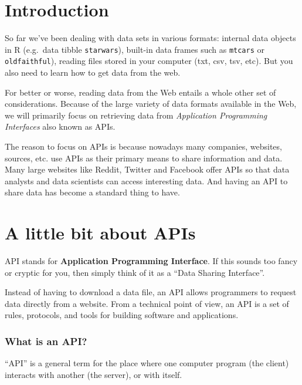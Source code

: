\documentclass[
]{book}
\begin{document}
\hypertarget{introduction-1}{%
\section{Introduction}\label{introduction-1}}

So far we've been dealing with data sets in various formats: internal data
objects in R (e.g.~data tibble \texttt{starwars}), built-in data frames such as
\texttt{mtcars} or \texttt{oldfaithful}), reading files stored in your computer (txt, csv,
tsv, etc). But you also need to learn how to get data from the web.

For better or worse, reading data from the Web entails a whole other set of
considerations. Because of the large variety of data formats available in the
Web, we will primarily focus on retrieving data from
\emph{Application Programming Interfaces} also known as APIs.

The reason to focus on APIs is because nowadays many companies, websites,
sources, etc. use APIs as their primary means to share information and data.
Many large websites like Reddit, Twitter and Facebook offer APIs so that data
analysts and data scientists can access interesting data. And having an API to
share data has become a standard thing to have.

\hypertarget{a-little-bit-about-apis}{%
\section{A little bit about APIs}\label{a-little-bit-about-apis}}

API stands for \textbf{Application Programming Interface}. If this sounds too fancy
or cryptic for you, then simply think of it as a ``Data Sharing Interface''.

Instead of having to download a data file, an API allows programmers to request
data directly from a website. From a technical point of view, an API is a set
of rules, protocols, and tools for building software and applications.

\hypertarget{what-is-an-api}{%
\subsubsection*{What is an API?}\label{what-is-an-api}}

``API'' is a general term for the place where one computer program (the client)
interacts with another (the server), or with itself.
\end{document}

